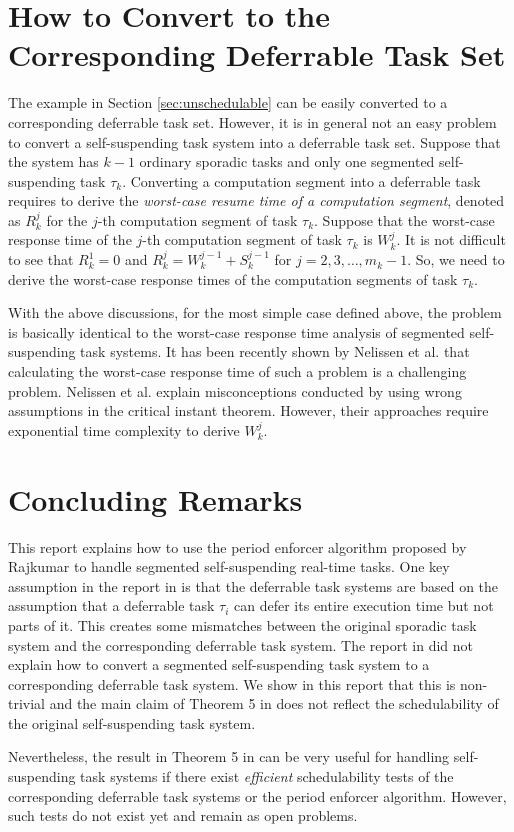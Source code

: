 \section{How to Convert to the Corresponding Deferrable Task Set}
\label{sec:convert}

The example in Section \ref{sec:unschedulable} can be easily converted to a corresponding deferrable task set. However, it is in general not an easy problem to convert a self-suspending task system into a deferrable task set. Suppose that the system has $k-1$ ordinary sporadic tasks and only one segmented self-suspending task $\tau_k$. Converting a computation segment into a deferrable task requires to derive the \emph{worst-case resume time of a computation segment}, denoted as $R_k^j$ for the $j$-th computation segment of task $\tau_k$. Suppose that the worst-case response time of the $j$-th computation segment of task $\tau_k$ is $W_k^j$. It is not difficult to see that $R_k^1=0$ and $R_k^j = W_k^{j-1}+S_k^{j-1}$ for $j=2,3,\ldots,m_k-1$. So, we need to derive the worst-case response times of the computation segments of task $\tau_k$. 

With the above discussions, for the most simple case defined above, the problem is basically identical to the worst-case response time analysis of segmented self-suspending task systems. It has been recently shown by Nelissen et al. \cite{ecrts15nelissen} that calculating the worst-case response time of such a problem is a challenging problem. Nelissen et al. \cite{ecrts15nelissen} explain misconceptions conducted by using wrong assumptions in the critical instant theorem. However, their approaches require exponential time complexity to derive $W_k^{j}$. 

\section{Concluding Remarks}

This report explains how to use the period enforcer algorithm proposed by Rajkumar \cite{Raj:suspension1991} to handle segmented self-suspending real-time tasks. One key assumption in the report in \cite{Raj:suspension1991} is that the deferrable task systems are based on the assumption that a deferrable task $\tau_i$ can defer its entire execution time but not parts of it. This creates some mismatches between the original sporadic task system and the corresponding deferrable task system.  The report in  \cite{Raj:suspension1991} did not explain how to convert a segmented self-suspending task system to a corresponding deferrable task system. We show in this report that this is non-trivial and the main claim of Theorem 5 in \cite{Raj:suspension1991} does not reflect the schedulability of the original self-suspending task system. 


Nevertheless, the result in Theorem 5 in \cite{Raj:suspension1991} can be very useful for handling self-suspending task systems if there exist \emph{efficient} schedulability tests of the corresponding deferrable task systems or the period enforcer algorithm. However, such tests do not exist yet and remain as open problems.


